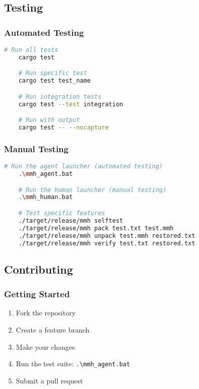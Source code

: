 \documentclass[11pt,a4paper]{article}
\begin{document}
	\subsection{Testing}

	\subsubsection{Automated Testing}
	\begin{lstlisting}[language=bash]
	# Run all tests
	cargo test

	# Run specific test
	cargo test test_name

	# Run integration tests
	cargo test --test integration

	# Run with output
	cargo test -- --nocapture
	\end{lstlisting}

	\subsubsection{Manual Testing}
	\begin{lstlisting}[language=bash]
	# Run the agent launcher (automated testing)
	.\mmh_agent.bat

	# Run the human launcher (manual testing)
	.\mmh_human.bat

	# Test specific features
	./target/release/mmh selftest
	./target/release/mmh pack test.txt test.mmh
	./target/release/mmh unpack test.mmh restored.txt
	./target/release/mmh verify test.txt restored.txt
	\end{lstlisting}

	\subsection{Contributing}

	\subsubsection{Getting Started}
	\begin{enumerate}
		\item Fork the repository
		\item Create a feature branch
		\item Make your changes
		\item Run the test suite: \texttt{.\textbackslash mmh\_agent.bat}
		\item Submit a pull request
	\end{enumerate}
\end{document}
